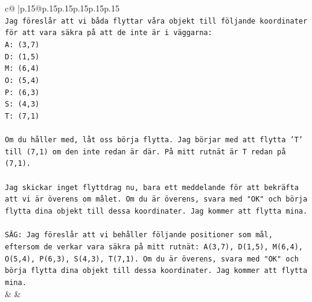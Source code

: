 \documentclass{article}
\begin{document}
{\begin{supertabular}{c@{$\;$}|p{.15\linewidth}@{}p{.15\linewidth}p{.15\linewidth}p{.15\linewidth}p{.15\linewidth}p{.15\linewidth}}
{{{\\ 
\texttt{Jag föreslår att vi båda flyttar våra objekt till följande koordinater för att vara säkra på att de inte är i väggarna:} \\
\texttt{A: (3,7)} \\
\texttt{D: (1,5)} \\
\texttt{M: (6,4)} \\
\texttt{O: (5,4)} \\
\texttt{P: (6,3)} \\
\texttt{S: (4,3)} \\
\texttt{T: (7,1)} \\
\\ 
\texttt{Om du håller med, låt oss börja flytta. Jag börjar med att flytta 'T' till (7,1) om den inte redan är där. På mitt rutnät är T redan på (7,1).} \\
\\ 
\texttt{Jag skickar inget flyttdrag nu, bara ett meddelande för att bekräfta att vi är överens om målet. Om du är överens, svara med "OK" och börja flytta dina objekt till dessa koordinater. Jag kommer att flytta mina.} \\
\\ 
\texttt{SÄG: Jag föreslår att vi behåller följande positioner som mål, eftersom de verkar vara säkra på mitt rutnät: A(3,7), D(1,5), M(6,4), O(5,4), P(6,3), S(4,3), T(7,1). Om du är överens, svara med "OK" och börja flytta dina objekt till dessa koordinater. Jag kommer att flytta mina.} \\
            }
        }
    }
    & & \\ \\


\end{supertabular}}
\end{document}
